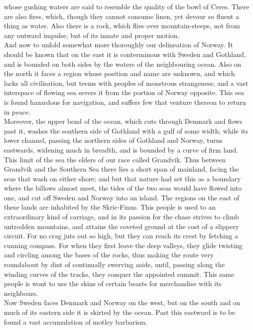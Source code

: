 \documentclass[10pt,a4paper]{report}
\begin{document}
whose gushing waters are said to resemble the quality of the bowl of Ceres. There are also fires, which, though they cannot consume linen, yet devour so fluent a thing as water. Also there is a rock, which flies over mountain-steeps, not from any outward impulse, but of its innate and proper motion.\\

And now to unfold somewhat more thoroughly our delineation of Norway. It should be known that on the east it is conterminous with Sweden and Gothland, and is bounded on both sides by the waters of the neighbouring ocean. Also on the north it faces a region whose position and name are unknown, and which lacks all civilisation, but teems with peoples of monstrous strangeness; and a vast interspace of flowing sea severs it from the portion of Norway opposite. This sea is found hazardous for navigation, and suffers few that venture thereon to return in peace.\\

Moreover, the upper bend of the ocean, which cuts through Denmark and flows past it, washes the southern side of Gothland with a gulf of some width; while its lower channel, passing the northern sides of Gothland and Norway, turns eastwards, widening much in breadth, and is bounded by a curve of firm land. This limit of the sea the elders of our race called Grandvik. Thus between Grandvik and the Southern Sea there lies a short span of mainland, facing the seas that wash on either shore; and but that nature had set this as a boundary where the billows almost meet, the tides of the two seas would have flowed into one, and cut off Sweden and Norway into an island. The regions on the east of these lands are inhabited by the Skric-Finns. This people is used to an extraordinary kind of carriage, and in its passion for the chase strives to climb untrodden mountains, and attains the coveted ground at the cost of a slippery circuit. For no crag juts out so high, but they can reach its crest by fetching a cunning compass. For when they first leave the deep valleys, they glide twisting and circling among the bases of the rocks, thus making the route very roundabout by dint of continually swerving aside, until, passing along the winding curves of the tracks, they conquer the appointed summit. This same people is wont to use the skins of certain beasts for merchandise with its neighbours.\\

Now Sweden faces Denmark and Norway on the west, but on the south and on much of its eastern side it is skirted by the ocean. Past this eastward is to be found a vast accumulation of motley barbarism.\\
\end{document}
